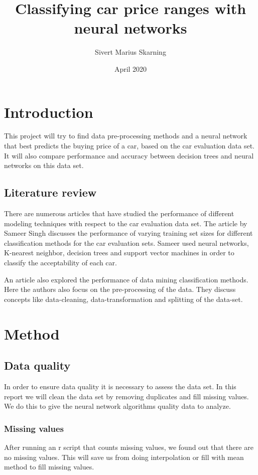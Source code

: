 \documentclass[a4paper, 12pt]{article}
\title{Classifying car price ranges with neural networks}
\author{Sivert Marius Skarning}
\date{April 2020}
\begin{document}
\maketitle
\clearpage
\tableofcontents
\clearpage
{}

\section{Introduction}
This project will try to find data pre-processing methods and a neural network that best predicts the buying price of a car, based on the car evaluation data set.
It will also compare performance and accuracy between decision trees and neural networks on this data set.
\subsection{Literature review}
There are numerous articles that have studied the performance of different modeling techniques with respect to the car evaluation data set. The article by Sameer Singh\cite{singh2005modeling} discusses the performance of varying training set sizes for different classification methods for the car evaluation sets. Sameer used neural networks, K-nearest neighbor, decision trees and support vector machines in order to classify the acceptability of each car.


An article\cite{perf} also explored the performance of data mining classification methods. Here the authors also focus on the pre-processing of the data. They discuss concepts like data-cleaning, data-transformation and splitting of the data-set.

\section{Method}

\subsection{Data quality}
In order to ensure data quality it is necessary to assess the data set. In this report we will clean the data set by removing duplicates and fill missing values. We do this to give the neural network algorithms quality data to analyze\cite{quality}.
\subsubsection{Missing values}
After running an r script that counts missing values, we found out that there are no missing values. This will save us from doing interpolation or fill with mean method to fill missing values.
\end{document}
